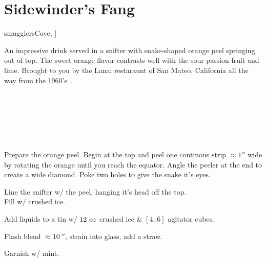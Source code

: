 \section[Sidewinder's Fang]{Sidewinder's Fang~}


\begin{recipestats}[
	servings=1,
	preptime=10~\minute,
	original=\citeauthor{smugglersCove}~\cite[p.~62]{smugglersCove},
]
\end{recipestats}

\begin{recipeabstract}
	An impressive drink served in a snifter with snake-shaped orange peel springing out of top.
	The sweet orange flavor contrasts well with the sour passion fruit and lime.
	Brought to you by the Lanai restaraunt of San Mateo, California all the way from the 1960's~\cite{smugglersCove}.
\end{recipeabstract}


\begin{ingredientcolumns}[1]
	\begin{ingredientblock}
		\\
		\\
		\\
		\\
		\\
	\end{ingredientblock}
\end{ingredientcolumns}


\begin{preparation}
	\item Prepare the orange peel.
		Begin at the top and peel one continous strip $\approx1''$ wide by rotating the orange until you reach the equator.
		Angle the peeler at the end to create a wide diamond.
		Poke two holes to give the snake it's eyes.
	\item Line the snifter w/ the peel, hanging it's head off the top.\\
		Fill w/ crushed ice.
	\item Add liquids to a tin w/ $12~oz$ crushed ice \& $[4..6]$ agitator cubes.
	\item Flash blend $\approx10~\second$, strain into glass, add a straw.
	\item Garnish w/ mint.
\end{preparation}


\recipeend%
